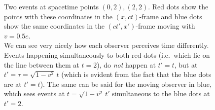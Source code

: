\begin{figure}
\centering


\caption{Two events at spacetime points $(0,2), (2,2)$. Red dots show the points with these coordinates in the $(x, ct)$-frame and blue dots show the same coordinates in the $(ct', x')$-frame moving with $v = 0.5 c$.\\
We can see very nicely how each observer perceives time differently. Events happening simultaneously to both red dots (i.e.~which lie on the line between them at $t = 2$), do \emph{not} happen at $t' = t$, but at $t' = \tau = \sqrt{1 - v^2} \, t$ (which is evident from the fact that the blue dots are at $t' = t$). The same can be said for the moving observer in blue, which sees events at $t = \sqrt{1 - v^2} \, t'$ simultaneous to the blue dots at $t' = 2$.}
\end{figure}



\newpage




